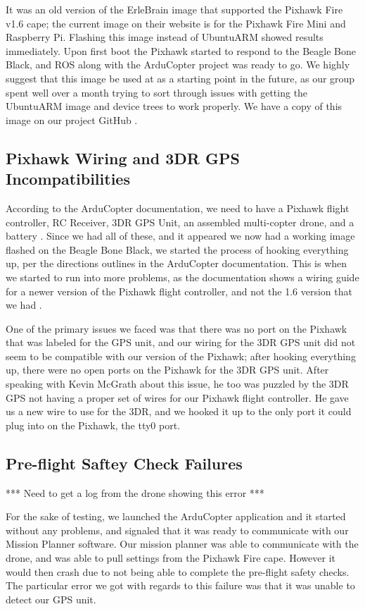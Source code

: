 \documentclass[IEEEtran,letterpaper,10pt,notitlepage,draftclsnofoot]{article}
\begin{document}
It was an old version of the ErleBrain image that supported the Pixhawk Fire v1.6 cape; the current image on
their website is for the Pixhawk Fire Mini and Raspberry Pi. Flashing this image instead of UbuntuARM showed
results immediately. Upon first boot the Pixhawk started to respond to the Beagle Bone Black, and ROS along
with the ArduCopter project was ready to go. We highly suggest that this image be used at as a starting point
in the future, as our group spent well over a month trying to sort through issues with getting the UbuntuARM
image and device trees to work properly. We have a copy of this image on our project GitHub \cite{ErleBrainAIOImage}.

\subsection{Pixhawk Wiring and 3DR GPS Incompatibilities}

According to the ArduCopter documentation, we need to have a Pixhawk flight controller, RC Receiver, 3DR GPS
Unit, an assembled multi-copter drone, and a battery \cite{ArduCopterIntro}.
Since we had all of these, and it appeared we now had a working image flashed on the Beagle Bone Black, we
started the process of hooking everything up, per the directions outlines in
the ArduCopter documentation. This is when we started to run into more problems, as the documentation shows a
wiring guide for a newer version of the Pixhawk flight controller, and not the 1.6 version that we had
\cite{ArduPixhawkWiring}.

One of the primary issues we faced was that there was no port on the Pixhawk that was labeled for the GPS
unit, and our wiring for the 3DR GPS unit did not seem to be compatible with our version of the Pixhawk; after
hooking everything up, there were no open ports on the Pixhawk for the 3DR GPS unit.
After speaking with Kevin McGrath about this issue, he too was puzzled by the 3DR GPS not having a proper
set of wires for our Pixhawk flight controller. He gave us a new wire to use for the 3DR, and we hooked it
up to the only port it could plug into on the Pixhawk, the tty0 port.


\subsection{Pre-flight Saftey Check Failures}

*** Need to get a log from the drone showing this error ***

For the sake of testing, we launched the ArduCopter application and it started without any problems, and
signaled that it was ready to communicate with our Mission Planner software. Our mission planner was able to
communicate with the drone, and was able to pull settings from the Pixhawk Fire cape. However it would then
crash due to not being able to complete the pre-flight safety checks. The particular error we got with
regards to this failure was that it was unable to detect our GPS unit.
\end{document}
